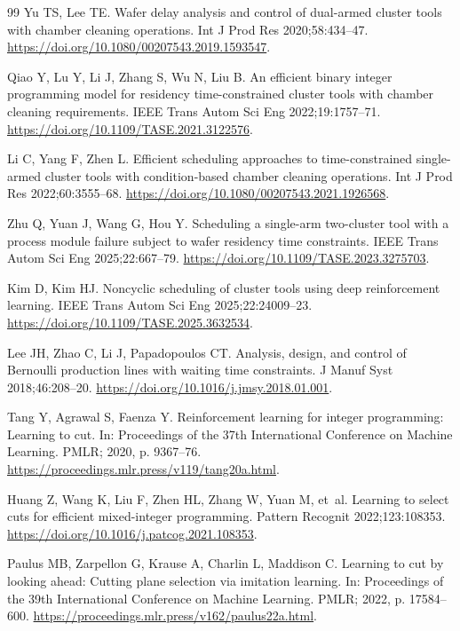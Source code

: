 \documentclass[final,5p,times,twocolumn]{elsarticle}
\begin{document}
\begin{thebibliography}{99}
Yu TS, Lee TE. Wafer delay analysis and control of dual-armed cluster tools with chamber cleaning operations.
Int J Prod Res 2020;58:434--47.
\url{https://doi.org/10.1080/00207543.2019.1593547}.

Qiao Y, Lu Y, Li J, Zhang S, Wu N, Liu B. An efficient binary integer programming model for residency time-constrained cluster tools with chamber cleaning requirements.
IEEE Trans Autom Sci Eng 2022;19:1757--71.
\url{https://doi.org/10.1109/TASE.2021.3122576}.

Li C, Yang F, Zhen L. Efficient scheduling approaches to time-constrained single-armed cluster tools with condition-based chamber cleaning operations.
Int J Prod Res 2022;60:3555--68.
\url{https://doi.org/10.1080/00207543.2021.1926568}.

Zhu Q, Yuan J, Wang G, Hou Y. Scheduling a single-arm two-cluster tool with a process module failure subject to wafer residency time constraints.
IEEE Trans Autom Sci Eng 2025;22:667--79.
\url{https://doi.org/10.1109/TASE.2023.3275703}.

Kim D, Kim HJ. Noncyclic scheduling of cluster tools using deep reinforcement learning.
IEEE Trans Autom Sci Eng 2025;22:24009--23.
\url{https://doi.org/10.1109/TASE.2025.3632534}.

Lee JH, Zhao C, Li J, Papadopoulos CT. Analysis, design, and control of {Bernoulli} production lines with waiting time constraints.
J Manuf Syst 2018;46:208--20.
\url{https://doi.org/10.1016/j.jmsy.2018.01.001}.

Tang Y, Agrawal S, Faenza Y. Reinforcement learning for integer programming: Learning to cut.
In: Proceedings of the 37th International Conference on Machine Learning. PMLR; 2020, p. 9367--76.
\url{https://proceedings.mlr.press/v119/tang20a.html}.

Huang Z, Wang K, Liu F, Zhen HL, Zhang W, Yuan M, et~al. Learning to select cuts for efficient mixed-integer programming.
Pattern Recognit 2022;123:108353.
\url{https://doi.org/10.1016/j.patcog.2021.108353}.

Paulus MB, Zarpellon G, Krause A, Charlin L, Maddison C. Learning to cut by looking ahead: Cutting plane selection via imitation learning.
In: Proceedings of the 39th International Conference on Machine Learning. PMLR; 2022, p. 17584--600.
\url{https://proceedings.mlr.press/v162/paulus22a.html}.


\end{thebibliography}
\end{document}
